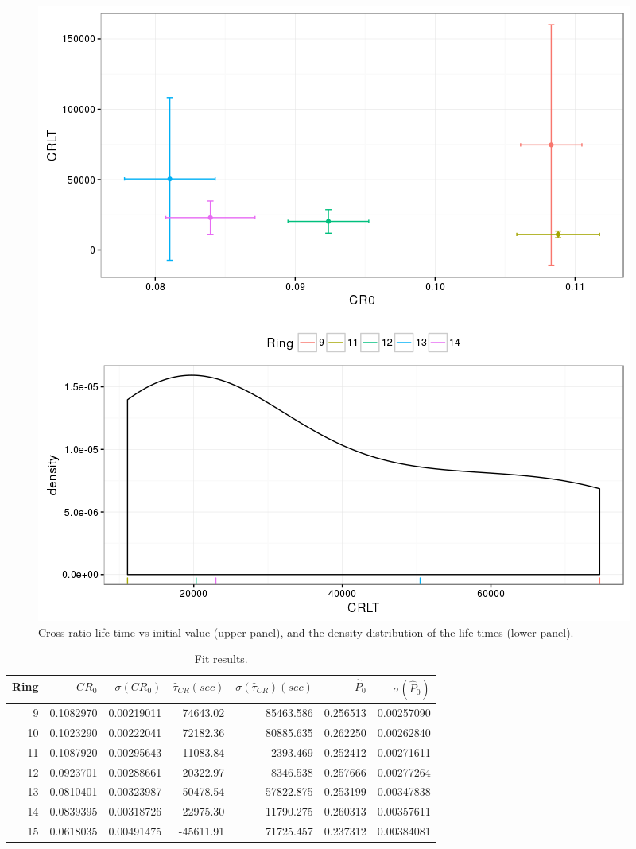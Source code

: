 \documentclass{article}
\begin{document}
\begin{figure}[h]
	\centering
	\includegraphics[scale=.8]{PolAna-CRLTvsCR0}
	\caption{Cross-ratio life-time vs initial value (upper panel), and the density distribution of the life-times (lower panel).\label{fig:R-SepRings}}
\end{figure}

\begin{table}[h]
	\centering
	\caption{Fit results.\label{tbl:FitRes}}
	\begin{tabular}{rrrrrrr}
		\hline
		Ring &    $CR_0$ & $\sigma(CR_0)$ & $\hat{\tau}_{CR} (sec)$ & $\sigma(\hat{\tau}_{CR})(sec)$ & $\hat{P}_0$ & $\sigma(\hat{P}_0)$ \\ \hline
		   9 & 0.1082970 &     0.00219011 &                74643.02 &                      85463.586 &    0.256513 &          0.00257090 \\
		  10 & 0.1023290 &     0.00222041 &                72182.36 &                      80885.635 &    0.262250 &          0.00262840 \\
		  11 & 0.1087920 &     0.00295643 &                11083.84 &                       2393.469 &    0.252412 &          0.00271611 \\
		  12 & 0.0923701 &     0.00288661 &                20322.97 &                       8346.538 &    0.257666 &          0.00277264 \\
		  13 & 0.0810401 &     0.00323987 &                50478.54 &                      57822.875 &    0.253199 &          0.00347838 \\
		  14 & 0.0839395 &     0.00318726 &                22975.30 &                      11790.275 &    0.260313 &          0.00357611 \\
		  15 & 0.0618035 &     0.00491475 &               -45611.91 &                      71725.457 &    0.237312 &          0.00384081 \\ \hline
	\end{tabular}
\end{table}
\end{document}
